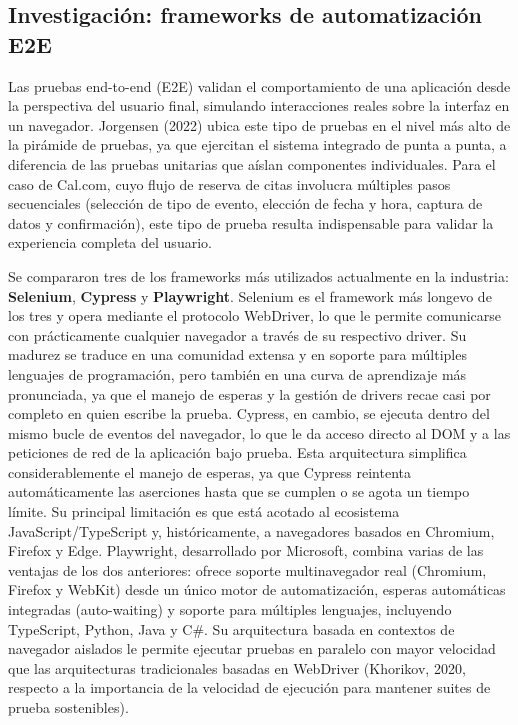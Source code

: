 \documentclass{article}
\begin{document}

\subsection{Investigación: frameworks de automatización E2E}

Las pruebas end-to-end (E2E) validan el comportamiento de una
aplicación desde la perspectiva del usuario final, simulando
interacciones reales sobre la interfaz en un navegador. Jorgensen
(2022) ubica este tipo de pruebas en el nivel más alto de la
pirámide de pruebas, ya que ejercitan el sistema integrado de punta
a punta, a diferencia de las pruebas unitarias que aíslan
componentes individuales. Para el caso de Cal.com, cuyo flujo de
reserva de citas involucra múltiples pasos secuenciales
(selección de tipo de evento, elección de fecha y hora, captura de
datos y confirmación), este tipo de prueba resulta indispensable
para validar la experiencia completa del usuario.

Se compararon tres de los frameworks más utilizados actualmente en
la industria: \textbf{Selenium}, \textbf{Cypress} y
\textbf{Playwright}.
Selenium es el framework más longevo de los tres y opera mediante el
protocolo WebDriver, lo que le permite comunicarse con prácticamente
cualquier navegador a través de su respectivo driver.
Su madurez se traduce en una comunidad extensa y en soporte para
múltiples lenguajes de programación, pero también en una curva de
aprendizaje más pronunciada, ya que el manejo de esperas y la
gestión de drivers recae casi por completo en quien escribe la
prueba.
Cypress, en cambio, se ejecuta dentro del mismo bucle de eventos del
navegador, lo que le da acceso directo al DOM y a las peticiones de
red de la aplicación bajo prueba. Esta arquitectura simplifica
considerablemente el manejo de esperas, ya que Cypress reintenta
automáticamente las aserciones hasta que se cumplen o se agota un
tiempo límite. Su principal limitación es que está
acotado al ecosistema JavaScript/TypeScript y, históricamente, a
navegadores basados en Chromium, Firefox y Edge.
Playwright, desarrollado por Microsoft, combina varias de las
ventajas de los dos anteriores: ofrece soporte multinavegador real
(Chromium, Firefox y WebKit) desde un único motor de automatización,
esperas automáticas integradas (auto-waiting) y soporte para
múltiples lenguajes, incluyendo TypeScript, Python, Java y C\#. Su
arquitectura basada en contextos de navegador aislados le permite
ejecutar pruebas en paralelo con mayor velocidad que las
arquitecturas tradicionales basadas en WebDriver (Khorikov, 2020,
respecto a la importancia de la velocidad de ejecución para
mantener suites de prueba sostenibles).
\end{document}
